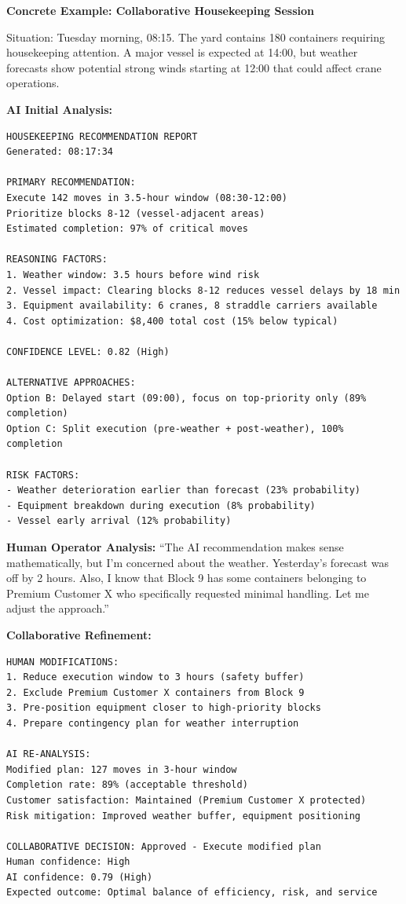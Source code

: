 \documentclass{article}
\begin{document}
\textbf{Concrete Example: Collaborative Housekeeping Session}

Situation: Tuesday morning, 08:15. The yard contains 180 containers requiring housekeeping attention. A major vessel is expected at 14:00, but weather forecasts show potential strong winds starting at 12:00 that could affect crane operations.

\textbf{AI Initial Analysis:}
\begin{verbatim}
HOUSEKEEPING RECOMMENDATION REPORT
Generated: 08:17:34

PRIMARY RECOMMENDATION:
Execute 142 moves in 3.5-hour window (08:30-12:00)
Prioritize blocks 8-12 (vessel-adjacent areas)
Estimated completion: 97% of critical moves

REASONING FACTORS:
1. Weather window: 3.5 hours before wind risk
2. Vessel impact: Clearing blocks 8-12 reduces vessel delays by 18 min
3. Equipment availability: 6 cranes, 8 straddle carriers available
4. Cost optimization: $8,400 total cost (15% below typical)

CONFIDENCE LEVEL: 0.82 (High)

ALTERNATIVE APPROACHES:
Option B: Delayed start (09:00), focus on top-priority only (89% completion)
Option C: Split execution (pre-weather + post-weather), 100% completion

RISK FACTORS:
- Weather deterioration earlier than forecast (23% probability)
- Equipment breakdown during execution (8% probability)
- Vessel early arrival (12% probability)
\end{verbatim}

\textbf{Human Operator Analysis:}
``The AI recommendation makes sense mathematically, but I'm concerned about the weather. Yesterday's forecast was off by 2 hours. Also, I know that Block 9 has some containers belonging to Premium Customer X who specifically requested minimal handling. Let me adjust the approach.''

\textbf{Collaborative Refinement:}
\begin{verbatim}
HUMAN MODIFICATIONS:
1. Reduce execution window to 3 hours (safety buffer)
2. Exclude Premium Customer X containers from Block 9
3. Pre-position equipment closer to high-priority blocks
4. Prepare contingency plan for weather interruption

AI RE-ANALYSIS:
Modified plan: 127 moves in 3-hour window
Completion rate: 89% (acceptable threshold)
Customer satisfaction: Maintained (Premium Customer X protected)
Risk mitigation: Improved weather buffer, equipment positioning

COLLABORATIVE DECISION: Approved - Execute modified plan
Human confidence: High
AI confidence: 0.79 (High)
Expected outcome: Optimal balance of efficiency, risk, and service
\end{verbatim}
\end{document}
